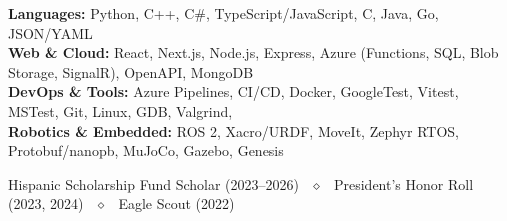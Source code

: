 \documentclass{resume}
\begin{document}
\textbf{Languages:} Python, C++, C\#, TypeScript/JavaScript, C, Java, Go, JSON/YAML \\
\textbf{Web \& Cloud:} React, Next.js, Node.js, Express, Azure (Functions, SQL, Blob Storage, SignalR), OpenAPI, MongoDB \\
\textbf{DevOps \& Tools:} Azure Pipelines, CI/CD, Docker, GoogleTest, Vitest, MSTest, Git, Linux, GDB, Valgrind, \\
\textbf{Robotics \& Embedded:} ROS 2, Xacro/URDF, MoveIt, Zephyr RTOS, Protobuf/nanopb, MuJoCo, Gazebo, Genesis

Hispanic Scholarship Fund Scholar (2023–2026) ~$\diamond$~ President's Honor Roll (2023, 2024) ~$\diamond$~ Eagle Scout (2022)
\end{document}
